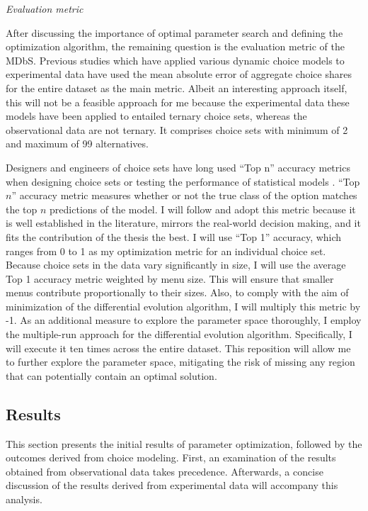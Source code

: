 \documentclass[a4paper,12pt]{article}
\begin{document}
\textit{Evaluation metric}

After discussing the importance of optimal parameter search and defining the optimization algorithm, the remaining question is the evaluation metric of the MDbS. Previous studies which have applied various dynamic choice models to experimental data have used the mean absolute error of aggregate choice shares for the entire dataset as the main metric. Albeit an interesting approach itself, this will not be a feasible approach for me because the experimental data these models have been applied to entailed ternary choice sets, whereas the observational data are not ternary. It comprises choice sets with minimum of 2 and maximum of 99 alternatives. 

Designers and engineers of choice sets have long used ``Top n'' accuracy metrics when designing choice sets or testing the performance of statistical models \citep{ricci2015recommender}. ``Top $n$'' accuracy metric measures whether or not the true class of the option matches the top $n$ predictions of the model. I will follow and adopt this metric because it is well established in the literature, mirrors the real-world decision making, and it fits the contribution of the thesis the best. I will use ``Top 1'' accuracy, which ranges from 0 to 1 as my optimization metric for an individual choice set. Because choice sets in the data vary significantly in size, I will use the average Top 1 accuracy metric weighted by menu size. This will ensure that smaller menus contribute proportionally to their sizes. Also, to comply with the aim of minimization of the differential evolution algorithm, I will multiply this metric by -1. As an additional measure to explore the parameter space thoroughly, I employ the multiple-run approach for the differential evolution algorithm. Specifically, I will execute it ten times across the entire dataset. This reposition will allow me to further explore the parameter space, mitigating the risk of missing any region that can potentially contain an optimal solution.


\subsection{Results}

This section presents the initial results of parameter optimization, followed by the outcomes derived from choice modeling. First, an examination of the results obtained from observational data takes precedence. Afterwards, a concise discussion of the results derived from experimental data will accompany this analysis.
\end{document}

